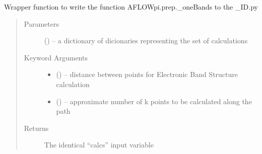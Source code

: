 \documentclass[letterpaper,10pt,english]{sphinxmanual}
\begin{document}

\begin{fulllineitems}
\label{\detokenize{prep:prep.bands}}
Wrapper function to write the function AFLOWpi.prep.\_oneBands to the \_ID.py
\begin{quote}\begin{description}
\item[{Parameters}] \leavevmode
{} () -- a dictionary of dicionaries representing the set of calculations

\item[{Keyword Arguments}] \leavevmode\begin{itemize}
\item {} 
 () -- distance between points for Electronic Band Structure calculation

\item {} 
 () -- approximate number of k points to be calculated along the path

\end{itemize}

\item[{Returns}] \leavevmode
The identical ``calcs'' input variable

\end{description}\end{quote}

\end{fulllineitems}

\end{document}
